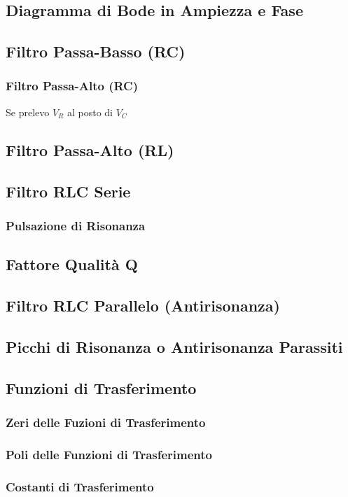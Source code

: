 \documentclass[../main.tex]{subfiles}
\begin{document}
	\subsection{Diagramma di Bode in Ampiezza e Fase}
	\subsection{Filtro Passa-Basso (RC)}
	\subsubsection{Filtro Passa-Alto (RC)}
	Se prelevo $V_R$ al posto di $V_C$
	\subsection{Filtro Passa-Alto (RL)}
	\subsection{Filtro RLC Serie}
	\subsubsection{Pulsazione di Risonanza}
	\subsection{Fattore Qualità Q}
	\subsection{Filtro RLC Parallelo (Antirisonanza)}
	\subsection{Picchi di Risonanza o Antirisonanza Parassiti}
	\subsection{Funzioni di Trasferimento}
	\subsubsection{Zeri delle Fuzioni di Trasferimento}
	\subsubsection{Poli delle Funzioni di Trasferimento}
	\subsubsection{Costanti di Trasferimento}
\end{document}
